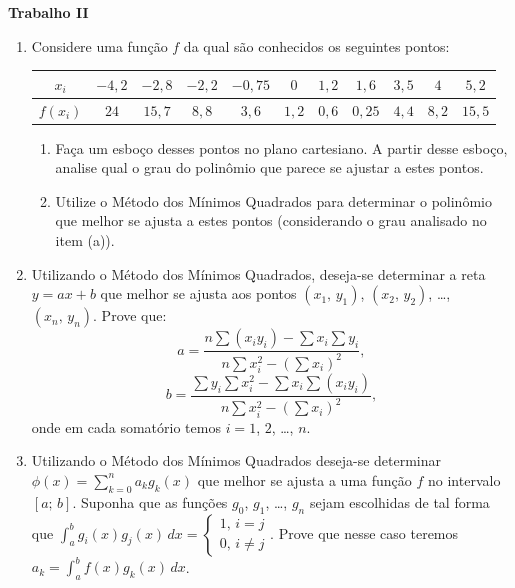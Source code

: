 \documentclass[12pt,a4paper]{article}
\begin{document}
\begin{center}
  \textbf{Trabalho II}
\end{center}

\begin{enumerate}
   \item Considere uma função $f$ da qual são conhecidos os seguintes pontos:

    \begin{center}
      \begin{tabular}{c|c|c|c|c|c|c|c|c|c|c}
        $x_i$ & $-4,2$ & $-2,8$ & $-2,2$ & $-0,75$ & $0$ & $1,2$ & $1,6$ & $3,5$ & $4$ & $5,2$\\ \hline
        $f(x_i)$ & $24$ & $15,7$ & $8,8$ & $3,6$ & $1,2$ & $0,6$ & $0,25$ & $4,4$ & $8,2$ & $15,5$
       \end{tabular}
    \end{center}

    \begin{enumerate}
      \item Faça um esboço desses pontos no plano cartesiano. A partir desse esboço, 
      analise qual o grau do polinômio que parece se ajustar a estes pontos.
      \item Utilize o Método dos Mínimos Quadrados para determinar o polinômio que
      melhor se ajusta a estes pontos (considerando o grau analisado no item (a)).
    \end{enumerate}

  \item Utilizando o Método dos Mínimos Quadrados, deseja-se determinar a reta
  $y = ax + b$ que melhor se ajusta aos pontos $(x_1,\,y_1)$, $(x_2,\,y_2)$, 
  \ldots, $(x_n,\,y_n)$. Prove que:
  $$a = \dfrac{\displaystyle n\sum (x_iy_i) - \sum x_i\sum y_i}{\displaystyle n\sum x_i^2 - \left(\sum x_i\right)^2},$$
  $$b = \dfrac{\displaystyle \sum y_i\sum x_i^2 - \sum x_i\sum (x_iy_i)}{\displaystyle n\sum x_i^2 - \left(\sum x_i\right)^2},$$
  onde em cada somatório temos $i = 1$, $2$, \ldots, $n$.

  \item Utilizando o Método dos Mínimos Quadrados deseja-se determinar
  $\displaystyle \phi(x) = \sum_{k=0}^n a_kg_k(x)$ que melhor se ajusta a uma função $f$ no intervalo
  $[a;\, b]$. Suponha que as funções $g_0$, $g_1$, \ldots, $g_n$ sejam escolhidas de tal forma que
  $\displaystyle\int_a^b g_i(x)g_j(x)\,dx = \begin{cases}1,\,i = j \\ 0,\,i\neq j\end{cases}$.
  Prove que nesse caso teremos $a_k = \displaystyle\int_a^b f(x)g_k(x)\,dx$.


\end{enumerate}
\end{document}
